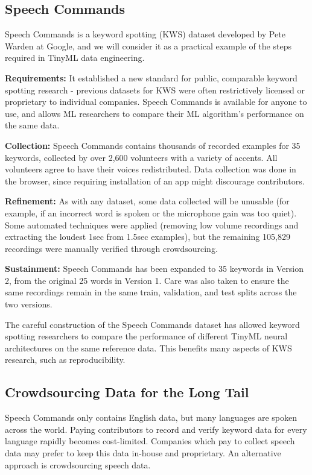 \subsection{Speech Commands}

    Speech Commands is a keyword spotting (KWS) dataset developed by Pete Warden at Google, and we will consider it as a practical example of the steps required in TinyML data engineering.
    
    \textbf{Requirements:} It established a new standard for public, comparable keyword spotting research - previous datasets for KWS were often restrictively licensed or proprietary to individual companies. Speech Commands is available for anyone to use, and allows ML researchers to compare their ML algorithm’s performance on the same data. 
    
    \textbf{Collection:} Speech Commands contains thousands of recorded examples for 35 keywords, collected by over 2,600 volunteers with a variety of accents. All volunteers agree to have their voices redistributed. Data collection was done in the browser, since requiring installation of an app might discourage contributors.
    
    \textbf{Refinement:} As with any dataset, some data collected will be unusable (for example, if an incorrect word is spoken or the microphone gain was too quiet). Some automated techniques were applied (removing low volume recordings and extracting the loudest 1sec from 1.5sec examples), but the remaining 105,829 recordings were manually verified through crowdsourcing.
    
    \textbf{Sustainment:} Speech Commands has been expanded to 35 keywords in Version 2, from the original 25 words in Version 1. Care was also taken to ensure the same recordings remain in the same train, validation, and test splits across the two versions.
    
    The careful construction of the Speech Commands dataset has allowed keyword spotting researchers to compare the performance of different TinyML neural architectures on the same reference data. This benefits many aspects of KWS research, such as reproducibility.
    
\subsection{Crowdsourcing Data for the Long Tail}

    Speech Commands only contains English data, but many languages are spoken across the world. Paying contributors to record and verify keyword data for every language rapidly becomes cost-limited. Companies which pay to collect speech data may prefer to keep this data in-house and proprietary. An alternative approach is crowdsourcing speech data. 
    
